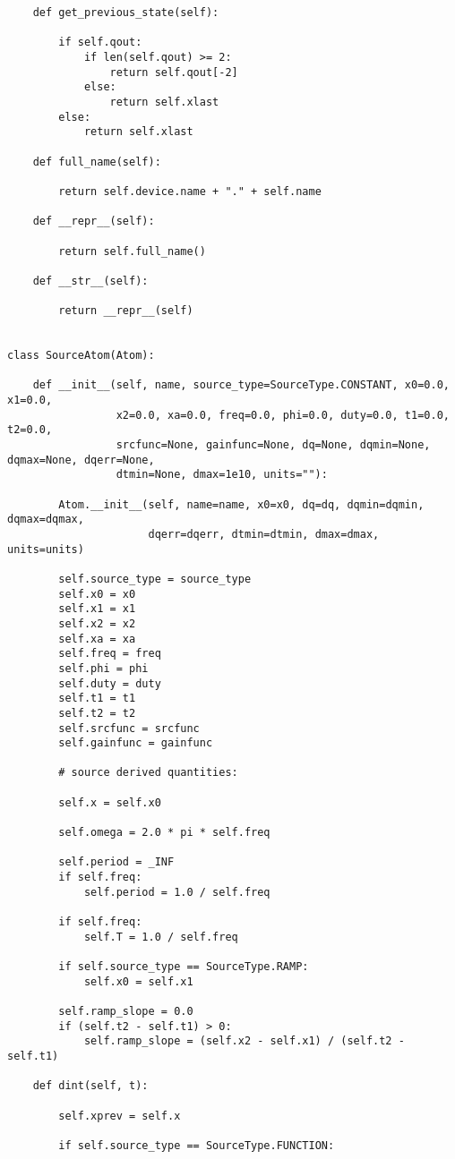 \begin{lstlisting}
    def get_previous_state(self):

        if self.qout:
            if len(self.qout) >= 2:
                return self.qout[-2]
            else:
                return self.xlast
        else:
            return self.xlast

    def full_name(self):

        return self.device.name + "." + self.name

    def __repr__(self):

        return self.full_name()

    def __str__(self):

        return __repr__(self)


class SourceAtom(Atom):

    def __init__(self, name, source_type=SourceType.CONSTANT, x0=0.0, x1=0.0,
                 x2=0.0, xa=0.0, freq=0.0, phi=0.0, duty=0.0, t1=0.0, t2=0.0,
                 srcfunc=None, gainfunc=None, dq=None, dqmin=None, dqmax=None, dqerr=None,
                 dtmin=None, dmax=1e10, units=""):

        Atom.__init__(self, name=name, x0=x0, dq=dq, dqmin=dqmin, dqmax=dqmax,
                      dqerr=dqerr, dtmin=dtmin, dmax=dmax, units=units)

        self.source_type = source_type
        self.x0 = x0
        self.x1 = x1
        self.x2 = x2
        self.xa = xa
        self.freq = freq
        self.phi = phi
        self.duty = duty
        self.t1 = t1
        self.t2 = t2
        self.srcfunc = srcfunc
        self.gainfunc = gainfunc

        # source derived quantities:

        self.x = self.x0

        self.omega = 2.0 * pi * self.freq

        self.period = _INF
        if self.freq:
            self.period = 1.0 / self.freq

        if self.freq:
            self.T = 1.0 / self.freq

        if self.source_type == SourceType.RAMP:
            self.x0 = self.x1

        self.ramp_slope = 0.0
        if (self.t2 - self.t1) > 0:
            self.ramp_slope = (self.x2 - self.x1) / (self.t2 - self.t1)

    def dint(self, t):

        self.xprev = self.x

        if self.source_type == SourceType.FUNCTION:


\end{lstlisting}
